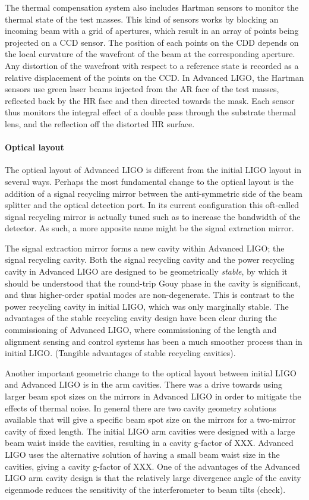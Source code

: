 The thermal compensation system also includes Hartman sensors to monitor the thermal state of the test masses. This kind of sensors works by blocking an incoming beam with a grid of apertures, which result in an array of points being projected on a CCD sensor. The position of each points on the CDD depends on the local curvature of the wavefront of the beam at the corresponding aperture. Any distortion of the wavefront with respect to a reference state is recorded as a relative displacement of the points on the CCD.
In Advanced LIGO, the Hartman sensors use green laser beams injected from the AR face of the test masses, reflected back by the HR face and then directed towards the mask. Each sensor thus monitors the integral effect of a double pass through the substrate thermal lens, and the reflection off the distorted HR surface.

\paragraph*{Optical layout}
The optical layout of Advanced LIGO is different from the initial LIGO layout in several ways. 
Perhaps the most fundamental change to the optical layout is the addition of a signal recycling 
mirror between the anti-symmetric side of the beam splitter and the optical detection port. 
In its current configuration this oft-called signal recycling mirror is actually tuned such as to 
increase the bandwidth of the detector. As such, a more apposite name might be the signal extraction mirror. 

The signal extraction mirror forms a new cavity within Advanced LIGO; the signal recycling cavity. 
Both the signal recycling cavity and the power recycling cavity in Advanced LIGO are designed to be 
geometrically \emph{stable}, by which it should be understood that the round-trip Gouy phase in the cavity 
is significant, and thus higher-order spatial modes are non-degenerate. 
This is contrast to the power recycling cavity in initial LIGO, which was only marginally stable. 
The advantages of the stable recycling cavity design have been clear during the commissioning of 
Advanced LIGO, where commissioning of the length and alignment sensing and control systems has 
been a much smoother process than in initial LIGO. (Tangible advantages of stable recycling cavities). 

Another important geometric change to the optical layout between initial LIGO and Advanced LIGO is 
in the arm cavities. There was a drive towards using larger beam spot sizes on the mirrors in Advanced 
LIGO in order to mitigate the effects of thermal noise. In general there are two cavity geometry solutions available 
that will give a specific beam spot size on the mirrors for a two-mirror cavity of fixed length. The initial LIGO 
arm cavities were designed with a large beam waist inside the cavities, resulting in a cavity g-factor of XXX. 
Advanced LIGO uses the alternative solution of having a small beam waist size in the cavities, giving a cavity g-factor of XXX. 
One of the advantages of the Advanced LIGO arm cavity design is that the relatively large divergence angle of the cavity 
eigenmode reduces the sensitivity of the interferometer to beam tilts (check). 

